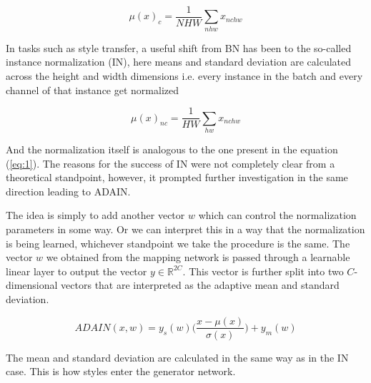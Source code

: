 \documentclass[conference]{IEEEtran}
\begin{document}
\begin{equation}
	\mu(x)_c = \frac{1}{NHW}\sum_{nhw}x_{nchw} 
\end{equation}

In tasks such as style transfer, a useful shift from BN has been to the so-called instance normalization (IN), here means and standard deviation are calculated across the height and width dimensions i.e. every instance in the batch and every channel of that instance get normalized

\begin{equation}
	\mu(x)_{nc} = \frac{1}{HW}\sum_{hw}x_{nchw} 
\end{equation}

And the normalization itself is analogous to the one present in the equation (\ref{eq:1}). 
The reasons for the success of IN were not completely clear from a theoretical standpoint, however, it prompted further investigation in the same direction leading to ADAIN.

The idea is simply to add another vector $w$ which can control the normalization parameters in some way. Or we can interpret this in a way that the normalization is being learned, whichever standpoint we take the procedure is the same. The vector $w$ we obtained from the mapping network is passed through a learnable linear layer to output the vector $y \in \mathbb{R}^{2C}$. This vector is further split into two $C$-dimensional vectors that are interpreted as the adaptive mean and standard deviation.

\begin{equation}
	ADAIN(x,w) = y_s(w)\big(\frac{x - \mu(x)}{\sigma(x)} 	\big) +  y_m(w)
\end{equation}

The mean and standard deviation are calculated in the same way as in the IN case. This is how styles enter the generator network.
\end{document}
